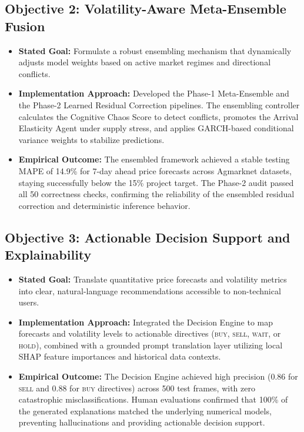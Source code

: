 \documentclass[12pt,a4paper]{report}
\theoremstyle{definition}
\theoremstyle{remark}
\begin{document}
\subsection{Objective 2: Volatility-Aware Meta-Ensemble Fusion}
\begin{itemize}
    \item \textbf{Stated Goal:} Formulate a robust ensembling mechanism that dynamically adjusts model weights based on active market regimes and directional conflicts.
    \item \textbf{Implementation Approach:} Developed the Phase-1 Meta-Ensemble and the Phase-2 Learned Residual Correction pipelines. The ensembling controller calculates the Cognitive Chaos Score to detect conflicts, promotes the Arrival Elasticity Agent under supply stress, and applies GARCH-based conditional variance weights to stabilize predictions.
    \item \textbf{Empirical Outcome:} The ensembled framework achieved a stable testing MAPE of 14.9\% for 7-day ahead price forecasts across Agmarknet datasets, staying successfully below the 15\% project target. The Phase-2 audit passed all 50 correctness checks, confirming the reliability of the ensembled residual correction and deterministic inference behavior.
\end{itemize}

\subsection{Objective 3: Actionable Decision Support and Explainability}
\begin{itemize}
    \item \textbf{Stated Goal:} Translate quantitative price forecasts and volatility metrics into clear, natural-language recommendations accessible to non-technical users.
    \item \textbf{Implementation Approach:} Integrated the Decision Engine to map forecasts and volatility levels to actionable directives (\textsc{buy}, \textsc{sell}, \textsc{wait}, or \textsc{hold}), combined with a grounded prompt translation layer utilizing local SHAP feature importances and historical data contexts.
    \item \textbf{Empirical Outcome:} The Decision Engine achieved high precision (0.86 for \textsc{sell} and 0.88 for \textsc{buy} directives) across 500 test frames, with zero catastrophic misclassifications. Human evaluations confirmed that 100\% of the generated explanations matched the underlying numerical models, preventing hallucinations and providing actionable decision support.
\end{itemize}
\end{document}
